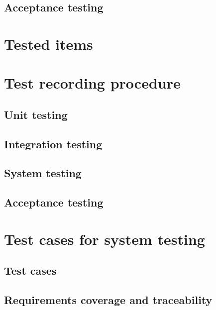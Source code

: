 \documentclass[12pt,titlepage,bibliography=totoc]{article}
\begin{document}
\subsection{Acceptance testing}

\section{Tested items}
\label{sec:tested-items}

\section{Test recording procedure}
\label{sec:test-recording-procedure}
\subsection{Unit testing}
\subsection{Integration testing}
\subsection{System testing}
\subsection{Acceptance testing}

\section{Test cases for system testing}
\label{sec:test-cases-for-system-testing}
\subsection{Test cases}
\subsection{Requirements coverage and traceability}

{}



\end{document}

